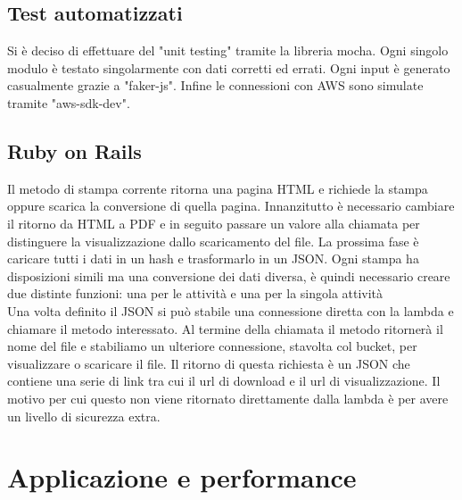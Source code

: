 \documentclass[12pt]{article}
\begin{document}
\subsection{Test automatizzati}
Si è deciso di effettuare del "unit testing" tramite la libreria mocha.
Ogni singolo modulo è testato singolarmente con dati corretti ed errati. 
Ogni input è generato casualmente grazie a "faker-js". 
Infine le connessioni con AWS sono simulate tramite "aws-sdk-dev". 

\subsection{Ruby on Rails}
Il metodo di stampa corrente ritorna una pagina HTML e richiede la stampa oppure 
scarica la conversione di quella pagina. Innanzitutto è necessario cambiare il 
ritorno da HTML a PDF e in seguito passare un valore alla chiamata per distinguere 
la visualizzazione dallo scaricamento del file. 
La prossima fase è caricare tutti i dati in un hash e trasformarlo in un JSON. 
Ogni stampa ha disposizioni simili ma una conversione dei dati diversa, è quindi 
necessario creare due distinte funzioni: una per le attività e una per la singola 
attività
\\ Una volta definito il JSON si può stabile una connessione diretta con la lambda e 
chiamare il metodo interessato.
Al termine della chiamata il metodo ritornerà il nome del file e stabiliamo un
ulteriore connessione, stavolta col bucket, per visualizzare o scaricare il file.
Il ritorno di questa richiesta è un JSON che
contiene una serie di link tra cui il url di download e il url di visualizzazione.
Il motivo per cui questo non viene ritornato direttamente dalla lambda è per avere 
un livello di sicurezza extra. 

\section{Applicazione e performance}
\end{document}
